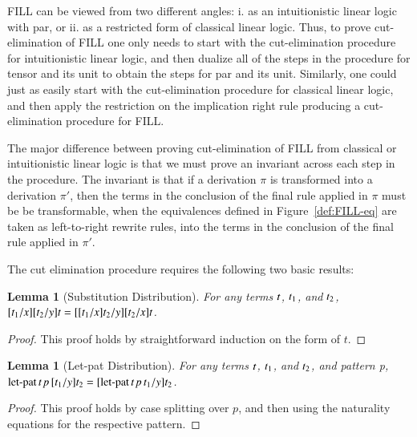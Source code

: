 \documentclass{elsarticle}
\newtheorem{lemma}[theorem]{Lemma}
\begin{document}
FILL can be viewed from two different angles: i. as an intuitionistic
linear logic with par, or ii. as a restricted form of classical linear
logic.  Thus, to prove cut-elimination of FILL one only needs to start
with the cut-elimination procedure for intuitionistic linear logic,
and then dualize all of the steps in the procedure for tensor and its
unit to obtain the steps for par and its unit.  Similarly, one could
just as easily start with the cut-elimination procedure for classical
linear logic, and then apply the restriction on the implication right
rule producing a cut-elimination procedure for FILL.

The major difference between proving cut-elimination of FILL from
classical or intuitionistic linear logic is that we must prove an
invariant across each step in the procedure.  The invariant is that if
a derivation $\pi$ is transformed into a derivation $\pi'$, then the
terms in the conclusion of the final rule applied in $\pi$ must be be
transformable, when the equivalences defined in
Figure~\ref{def:FILL-eq} are taken as left-to-right rewrite rules,
into the terms in the conclusion of the final rule applied in $\pi'$.

\begin{report}
  The cut elimination procedure requires the following two basic
results:
\begin{lemma}[Substitution Distribution]
  \label{lemma:substitution_distribution}
  For any terms $\mathit{t}$, $\mathit{t_{{\mathrm{1}}}}$, and $\mathit{t_{{\mathrm{2}}}}$, $[  \mathit{t_{{\mathrm{1}}}}  /  \mathit{x}  ]  [  \mathit{t_{{\mathrm{2}}}}  /  \mathit{y}  ]  \mathit{t} = [  [  \mathit{t_{{\mathrm{1}}}}  /  \mathit{x}  ]  \mathit{t_{{\mathrm{2}}}}  /  \mathit{y}  ]  [  \mathit{t_{{\mathrm{2}}}}  /  \mathit{x}  ]  \mathit{t}$.
\end{lemma}
\begin{proof}
  This proof holds by straightforward induction on the form of $t$.
\end{proof}

\begin{lemma}[Let-pat Distribution]
  \label{lemma:let-pat_distribution}
  For any terms $\mathit{t}$, $\mathit{t_{{\mathrm{1}}}}$, and $\mathit{t_{{\mathrm{2}}}}$, and pattern p, \\
  $ \mathsf{\operatorname{let-pat} }\, \mathit{t} \, \mathit{p} \, [  \mathit{t_{{\mathrm{1}}}}  /  \mathit{y}  ]  \mathit{t_{{\mathrm{2}}}}  = [   \mathsf{\operatorname{let-pat} }\, \mathit{t} \, \mathit{p} \, \mathit{t_{{\mathrm{1}}}}   /  \mathit{y}  ]  \mathit{t_{{\mathrm{2}}}}$.
\end{lemma}
\begin{proof}
  This proof holds by case splitting over $p$, and then using the
  naturality equations for the respective pattern.
\end{proof}
\end{report}
\end{document}
